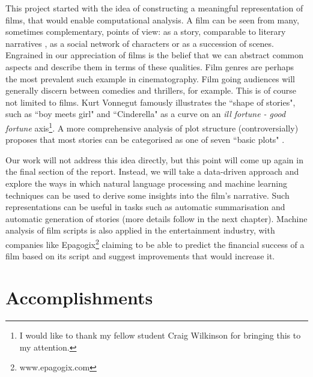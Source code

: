\documentclass[bsc,frontabs,singlespacing,parskip, twoside]{infthesis}
\begin{document}
This project started with the idea of constructing a meaningful representation of films, that would enable computational analysis. A film can be seen from many, sometimes complementary, points of view: as a story, comparable to literary narratives \cite{jinks1971celluloid}, as a social network of characters or as a succession of scenes. Engrained in our appreciation of films is the belief that we can abstract common aspects and describe them in terms of these qualities. Film genres are perhaps the most prevalent such example in cinematography. Film going audiences will generally discern between comedies and thrillers, for example. This is of course not limited to films. Kurt Vonnegut \cite{vonnegut2011man} famously illustrates the ``shape of stories", such as ``boy meets girl" and ``Cinderella" as a curve on an \textit{ill fortune - good fortune} axis\footnote{I would like to thank my fellow student Craig Wilkinson for bringing this to my attention.}. A more comprehensive analysis of plot structure (controversially) proposes that most stories can be categorised as one of seven ``basic plots" \cite{booker2004seven}.

Our work will not address this idea directly, but this point will come up again in the final section of the report. Instead, we will take a data-driven approach and explore the ways in which natural language processing and machine learning techniques can be used to derive some insights into the film's narrative. Such representations can be useful in tasks such as automatic summarisation and automatic generation of stories (more details follow in the next chapter). Machine analysis of film scripts is also applied in the entertainment industry, with companies like Epagogix\footnote{www.epagogix.com} claiming to be able to predict the financial success of a film based on its script and suggest improvements that would increase it.

\section{Accomplishments}
\end{document}
